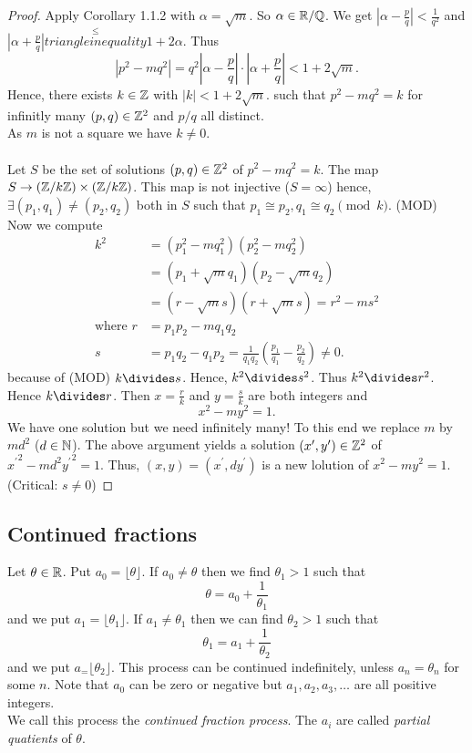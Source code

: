 \documentclass[NumTh.tex]{subfiles}
\begin{document}
\begin{proof}
  Apply Corollary 1.1.2 with $\alpha = \sqrt{m}$. So $\alpha \in \mathbb{R}/\mathbb{Q}$.
  We get $| \alpha - \frac{p}{q} | < \frac{1}{q^2}$ and $|\alpha + \frac{p}{q} | \overset{\leq}{triangle inequality} 1 + 2 \alpha$.
  Thus
  \[ |p^2 - mq^2| = q^2 | \alpha - \frac{p}{q} | \cdot |\alpha + \frac{p}{q}| < 1 + 2 \sqrt{m}. \]
  Hence, there exists $k \in \mathbb{Z}$ with $|k| < 1 + 2 \sqrt{m}$. such that $ p^2 - m q^2 = k$ for infinitly many $(p,q) \in \mathbb{Z}^2$ and $p/q$ all distinct.\\
  As $m$ is not a square we have $k \neq 0$.\\
  \\
  Let $S$ be the set of solutions $(p,q) \in \mathbb{Z}^2$ of $p^2 - m q^2 = k$.
  The map $S \to (\mathbb{Z}/k\mathbb{Z}) \times (\mathbb{Z}/k\mathbb{Z})$.
  This map is not injective ($S = \infty$) hence, $\exists (p_1,q_1) \neq (p_2,q_2)$ both in $S$ such that $p_1 \cong p_2, q_1 \cong q_2 \pmod k$. (MOD)\\%
  Now we compute
  \begin{align}
    k^2 &= (p_1^2 - m q_1^2)(p_2^2 - m q_2^2)\\
    &= (p_1 + \sqrt{m}q_1)(p_2 - \sqrt{m} q_2)\\
    &= (r - \sqrt{m} s)( r + \sqrt{m} s) = r^2 - m s^2\\
    \text{where } r &= p_1 p_2 - m q_1 q_2\\
    s &= p_1 q_2 - q_1 p_2 = \frac{1}{q_1 q_2} (\frac{p_1}{q_1} - \frac{p_2}{q_2}) \neq 0.
  \end{align}
  because of (MOD) $k \divides s$. Hence, $k^2 \divides s^2$. Thus $k^2 \divides r^2$. Hence $k \divides r$.
  Then $ x = \frac{r}{k}$ and $y = \frac{s}{k}$ are both integers and
  \[x^2 - m y^2 = 1. \]
  We have one solution but we need infinitely many! To this end we replace $m$ by $md^2$ ($d \in \mathbb{N}$).
  The above argument yields a solution $(x^\prime,y^\prime) \in \mathbb{Z}^2$ of ${x^\prime}^2 - md^2 {y^\prime}^2 = 1$.
  Thus, $(x,y) = (x^\prime,dy^\prime)$ is a new lolution of $x^2 - m y^2 = 1$.\\
  (Critical: $s \neq 0$)
\end{proof}

\subsection{Continued fractions}

Let $\theta \in \mathbb{R}$. Put $a_0 = \lfloor \theta \rfloor$. If $a_0 \neq \theta$ then we find $\theta_1 > 1$ such that
\[ \theta = a_0 + \frac{1}{\theta_1} \]
and we put $a_1 = \lfloor \theta_1 \rfloor$. If $a_1 \neq \theta_1$ then we can find $\theta_2 > 1$ such that
\[ \theta_1 = a_1 + \frac{1}{\theta_2} \]
and we put $a_ = \lfloor \theta_2 \rfloor$. This process can be continued indefinitely, unless $a_n = \theta_n$ for some $n$.
Note that $a_0$ can be zero or negative but  $a_1,a_2, a_3, \dots$ are all positive integers.\\
We call this process the \emph{continued fraction process}. The $a_i$ are called \emph{partial quatients} of $\theta$.
\end{document}
